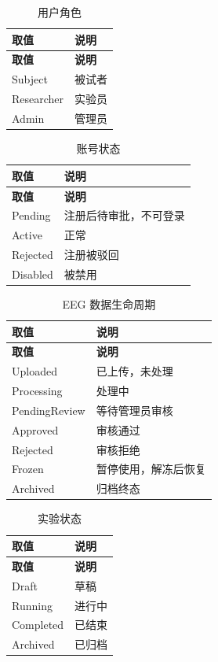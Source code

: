 {\small
\begin{longtable}{|p{28mm}|p{100mm}|}
\caption{用户角色} \label{tab:dd-enum-role} \\ \hline
\textbf{取值} & \textbf{说明}\\\hline
\endfirsthead
\hline \textbf{取值} & \textbf{说明}\\\hline \endhead
Subject & 被试者 \\ \hline
Researcher & 实验员 \\ \hline
Admin & 管理员 \\ \hline
\end{longtable}

\begin{longtable}{|p{28mm}|p{100mm}|}
\caption{账号状态} \label{tab:dd-enum-user-status} \\ \hline
\textbf{取值} & \textbf{说明}\\\hline
\endfirsthead
\hline \textbf{取值} & \textbf{说明}\\\hline \endhead
Pending & 注册后待审批，不可登录 \\ \hline
Active & 正常 \\ \hline
Rejected & 注册被驳回 \\ \hline
Disabled & 被禁用 \\ \hline
\end{longtable}

\begin{longtable}{|p{28mm}|p{100mm}|}
\caption{EEG 数据生命周期} \label{tab:dd-enum-data-lifecycle} \\ \hline
\textbf{取值} & \textbf{说明}\\\hline
\endfirsthead
\hline \textbf{取值} & \textbf{说明}\\\hline \endhead
Uploaded & 已上传，未处理 \\ \hline
Processing & 处理中 \\ \hline
PendingReview & 等待管理员审核 \\ \hline
Approved & 审核通过 \\ \hline
Rejected & 审核拒绝 \\ \hline
Frozen & 暂停使用，解冻后恢复 \\ \hline
Archived & 归档终态 \\ \hline
\end{longtable}

\begin{longtable}{|p{28mm}|p{100mm}|}
\caption{实验状态} \label{tab:dd-enum-exp-status} \\ \hline
\textbf{取值} & \textbf{说明}\\\hline
\endfirsthead
\hline \textbf{取值} & \textbf{说明}\\\hline \endhead
Draft & 草稿 \\ \hline
Running & 进行中 \\ \hline
Completed & 已结束 \\ \hline
Archived & 已归档 \\ \hline
\end{longtable}

}
